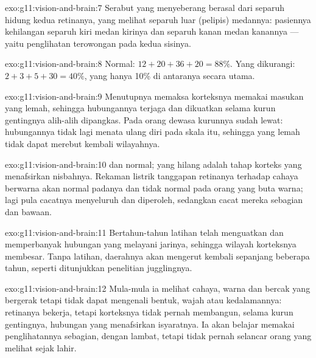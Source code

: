 \begin{solution}{exo:g11:vision-and-brain:7}
Serabut yang menyeberang berasal dari separuh hidung kedua retinanya,
yang melihat separuh luar (pelipis) medannya: pasiennya kehilangan
separuh kiri medan  kirinya dan separuh kanan medan  kanannya
--- yaitu penglihatan terowongan pada kedua sisinya.
\end{solution}

\begin{solution}{exo:g11:vision-and-brain:8}
Normal: $12 + 20 + 36 + 20 = 88\%$. Yang dikurangi: $2 + 3 + 5 + 30 = 40\%$,
yang hanya 10\% di antaranya secara utama.
\end{solution}

\begin{solution}{exo:g11:vision-and-brain:9}
Menutupnya memaksa korteksnya memakai masukan  yang lemah,
sehingga hubungannya terjaga dan dikuatkan selama kurun gentingnya
alih-alih dipangkas. Pada orang dewasa kurunnya sudah lewat:
hubungannya tidak lagi menata ulang diri pada skala itu, sehingga 
yang lemah tidak dapat merebut kembali wilayahnya.
\end{solution}

\begin{solution}{exo:g11:vision-and-brain:10}
 dan  normal; yang hilang adalah tahap korteks yang
menafsirkan nisbahnya. Rekaman listrik tanggapan retinanya terhadap
cahaya berwarna akan normal padanya dan tidak normal pada orang yang
buta warna; lagi pula cacatnya menyeluruh dan diperoleh, sedangkan
cacat mereka sebagian dan bawaan.
\end{solution}

\begin{solution}{exo:g11:vision-and-brain:11}
Bertahun-tahun latihan telah menguatkan dan memperbanyak hubungan yang
melayani jarinya, sehingga wilayah korteksnya membesar. Tanpa latihan,
daerahnya akan mengerut kembali sepanjang beberapa tahun, seperti
ditunjukkan penelitian jugglingnya.
\end{solution}

\begin{solution}{exo:g11:vision-and-brain:12}
Mula-mula ia melihat cahaya, warna dan bercak yang bergerak tetapi
tidak dapat mengenali bentuk, wajah atau kedalamannya: retinanya
bekerja, tetapi korteksnya tidak pernah membangun, selama kurun
gentingnya, hubungan yang menafsirkan isyaratnya. Ia akan belajar
memakai penglihatannya sebagian, dengan lambat, tetapi tidak pernah
selancar orang yang melihat sejak lahir.
\end{solution}

